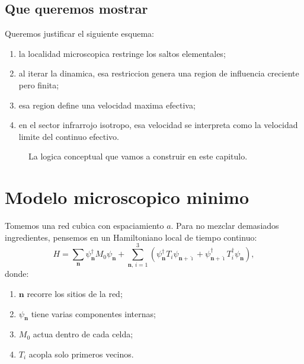 \subsection{Que queremos mostrar}
Queremos justificar el siguiente esquema:
\begin{enumerate}[label=\arabic*.]
    \item la localidad microscopica restringe los saltos elementales;
    \item al iterar la dinamica, esa restriccion genera una region de influencia creciente pero finita;
    \item esa region define una velocidad maxima efectiva;
    \item en el sector infrarrojo isotropo, esa velocidad se interpreta como la velocidad limite del continuo efectivo.
\end{enumerate}

\begin{figure}[h!]
\centering
{}
\caption{La logica conceptual que vamos a construir en este capitulo.}
\end{figure}

\section{Modelo microscopico minimo}
Tomemos una red cubica con espaciamiento \(a\). Para no mezclar demasiados ingredientes, pensemos en un Hamiltoniano local de tiempo continuo:
\begin{equation}
H = \sum_{\bm{n}} \psi_{\bm{n}}^\dagger M_0 \psi_{\bm{n}}
 + \sum_{\bm{n},\,i=1}^3
\left(
\psi_{\bm{n}}^\dagger T_i \psi_{\bm{n}+\hat{\imath}}
+ \psi_{\bm{n}+\hat{\imath}}^\dagger T_i^\dagger \psi_{\bm{n}}
\right),
\label{c19:eq:Hlocal}
\end{equation}
donde:
\begin{enumerate}[label=\arabic*.]
    \item \(\bm{n}\) recorre los sitios de la red;
    \item \(\psi_{\bm{n}}\) tiene varias componentes internas;
    \item \(M_0\) actua dentro de cada celda;
    \item \(T_i\) acopla solo primeros vecinos.
\end{enumerate}

